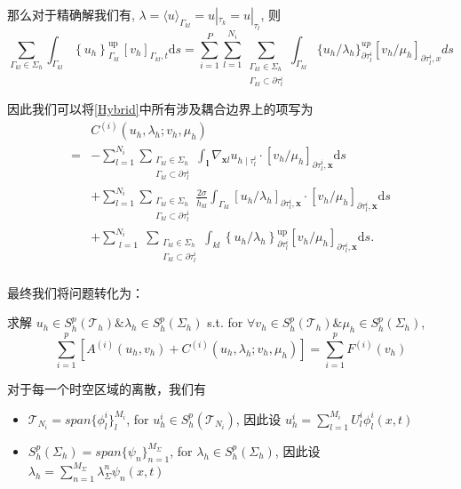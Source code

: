 那么对于精确解我们有, $\lambda=\langle u\rangle_{\Gamma_{kl}}=u|_{\tau_k}=u|_{\tau_l}$, 则
$$\sum_{\Gamma_{k l} \in \Sigma_{h}} \int_{\Gamma_{k l}}\left\{u_{h}\right\}_{\Gamma_{k l}}^{\text {up }}\left[v_{h}\right]_{\Gamma_{k l}, t} \mathrm{d} s=\sum_{i=1}^{P} \sum_{l=1}^{N_{i}} \sum_{\substack{\Gamma_{k l} \in \Sigma_{h} \\
\Gamma_{k l} \subset \partial \tau_{l}^{i}}}\int_{\Gamma_{kl}}\{u_h/\lambda_h\}_{\partial \tau_l^i}^{up}[v_h/\mu_h]_{\partial \tau_l^i,x}ds$$

因此我们可以将\ref{Hybrid}中所有涉及耦合边界上的项写为
$$\begin{aligned}
    &C^{(i)}(u_h,\lambda_h;v_h,\mu_h)\\
    =&-\sum_{l=1}^{N_{i}} \sum_{\substack{\Gamma_{k l} \in \Sigma_{h} \\
    \Gamma_{k l} \subset \partial \tau_{l}^{i}}} \int_{\boldsymbol{l}} \nabla_{\boldsymbol{x} l} u_{h \mid \tau_{l}^{i}} \cdot\left[v_{h} / \mu_{h}\right]_{\partial \tau_{l}^{i}, \boldsymbol{x}} \mathrm{d} s \\
    &+\sum_{l=1}^{N_{i}} \sum_{\substack{\Gamma_{k l} \in \Sigma_{h} \\
    \Gamma_{k l} \subset \partial \tau_{l}^{i}}} \frac{2 \sigma}{\bar{h}_{k l}} \int_{\Gamma_{k l}}\left[u_{h} / \lambda_{h}\right]_{\partial \tau_{l}^{i}, \boldsymbol{x}} \cdot\left[v_{h} / \mu_{h}\right]_{\partial \tau_{l}^{i}, \boldsymbol{x}} \mathrm{d} s \\
    &+\sum_{\substack{l=1}}^{N_{i}} \sum_{\substack{\Gamma_{k l} \in \Sigma_{h} \\
    \Gamma_{k l} \subset \partial \tau_{l}^{i}}} \int_{k l}\left\{u_{h} / \lambda_{h}\right\}_{\partial \tau_{l}^{i}}^{\mathrm{up}}\left[v_{h} / \mu_{h}\right]_{\partial \tau_{l}^{i}, \boldsymbol{x}} \mathrm{d} s . \\
\end{aligned}$$

最终我们将问题转化为：
\begin{tcolorbox}
    求解 $u_h\in S_h^p(\mathscr{T}_h)\& \lambda_h\in S_h^p(\Sigma_h)$ s.t. for $\forall v_h\in S_h^p(\mathscr{T}_h)\& \mu_h\in S_h^p(\Sigma_h)$,
$$\sum_{i=1}^{p}\left[A^{(i)}(u_h,v_h)+C^{(i)}(u_h,\lambda_h;v_h,\mu_h)\right]=\sum_{i=1}^{p}F^{(i)}(v_h)$$
\end{tcolorbox}


对于每一个时空区域的离散，我们有
\begin{itemize}
    \item $\mathscr{T}_{N_i}=span\{\phi_l^i\}^{M_i}_l$, for $u_h^i\in S_h^p(\mathscr{T}_{N_i})$, 因此设 $u_h^i=\sum_{l=1}^{M_i}U_l^i\phi_l^i(x,t)$
    \item $S_h^p(\Sigma_h)=span\{\psi_n\}_{n=1}^{M_\Sigma}$, for $\lambda_h\in S_h^p(\Sigma_h)$, 因此设 $\lambda_h=\sum_{n=1}^{M_\Sigma}\lambda_\Sigma^n\psi_n(x,t)$
\end{itemize}

